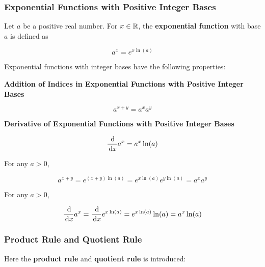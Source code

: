 \documentclass[a4paper,12pt]{article}
\begin{document}
\subsubsection{Exponential Functions with Positive Integer Bases}
\begin{dft}
  Let $a$ be a positive real number. For $x\in\mathbb{R}$, the \textbf{exponential function} with base $a$ is defined as

  $$a^{x}=e^{x\ln(a)}$$
\end{dft}\n

\begin{pst}
  Exponential functions with integer bases have the following properties:

  \begin{alist}
    \item \textbf{Addition of Indices in Exponential Functions with Positive Integer Bases}

    $$a^{x+y}=a^{x}a^{y}$$

    \item \textbf{Derivative of Exponential Functions with Positive Integer Bases}

    $$\frac{\,\mathrm{d}}{\,\mathrm{d} x}a^{x}=a^{x}\ln(a)$$
  \end{alist}

  \prf{} For any $a>0$,

  $$a^{x+y}=e^{(x+y)\ln(a)}=e^{x\ln(a)}e^{y\ln(a)}=a^{x}a^{y}$$\s

   For any $a>0$,

  $$\frac{\,\mathrm{d}}{\,\mathrm{d} x}a^{x}=\frac{\,\mathrm{d}}{\,\mathrm{d} x}e^{x\ln(a)}=e^{x\ln(a)}\ln(a)=a^{x}\ln(a)$$
\end{pst}

\subsubsection{Product Rule and Quotient Rule}
Here the \textbf{product rule} and \textbf{quotient rule} is introduced:\n
\end{document}
